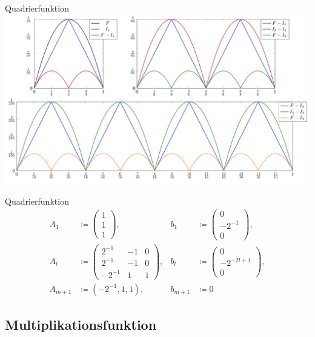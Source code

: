 \documentclass[10pt,aspectratio=169]{beamer}
\theoremstyle{plain} %
\theoremstyle{remark} %
\begin{document}
\begin{frame}{Quadrierfunktion}
    \centering
    \includegraphics[height=0.9\textheight]{images/approximation-proposition-6.png}
\end{frame}

\begin{frame}{Quadrierfunktion}
    \begin{align*}
        A_1 &\coloneqq \begin{pmatrix}
            1 \\ 1 \\ 1
        \end{pmatrix}, \quad &b_1 &\coloneqq \begin{pmatrix}
            0 \\ -2^{-1} \\ 0
        \end{pmatrix}, \\
        A_l &\coloneqq \begin{pmatrix}
            2^{-1} & -1 & 0 \\ 2^{-1} & -1 & 0 \\ -2^{-1} & 1 & 1
        \end{pmatrix}, &b_l &\coloneqq \begin{pmatrix}
            0 \\ -2^{-2l + 1} \\ 0
        \end{pmatrix}, \\
        A_{m+1} &\coloneqq (-2^{-1}, 1, 1), \quad &b_{m+1} &\coloneqq 0
    \end{align*}
\end{frame}

\subsection{Multiplikationsfunktion}
\end{document}
